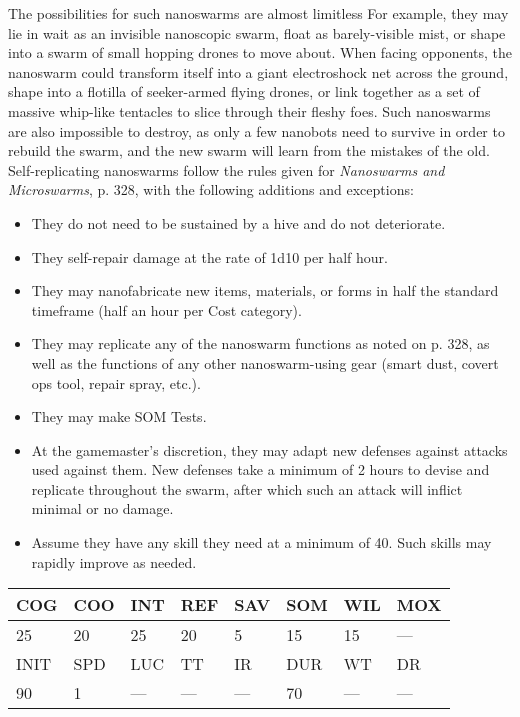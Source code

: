 The possibilities for such nanoswarms are almost limitless
For example, they may lie in wait as an invisible
nanoscopic swarm, float as barely-visible mist, or shape 
into a swarm of small hopping drones to move about. 
When facing opponents, the nanoswarm could transform 
itself into a giant electroshock net across the ground, 
shape into a flotilla of seeker-armed flying drones, or 
link together as a set of massive whip-like tentacles to 
slice through their fleshy foes. Such nanoswarms are 
also impossible to destroy, as only a few nanobots need 
to survive in order to rebuild the swarm, and the new 
swarm will learn from the mistakes of the old.
Self-replicating nanoswarms follow the rules given 
for \textit{Nanoswarms and Microswarms}, p. 328, with the 
following additions and exceptions:

\begin{itemize}
\item  They do not need to be sustained by a hive and 
do not deteriorate.
\item  They self-repair damage at the rate of 1d10 per 
half hour.
\item  They may nanofabricate new items, materials, 
or forms in half the standard timeframe (half an 
hour per Cost category).
\item They may replicate any of the nanoswarm functions
as noted on p. 328, as well as the functions
of any other nanoswarm-using gear (smart dust, 
covert ops tool, repair spray, etc.).
\item  They may make SOM Tests.
\item  At the gamemaster's discretion, they may adapt 
new defenses against attacks used against them. 
New defenses take a minimum of 2 hours to devise 
and replicate throughout the swarm, after which 
such an attack will inflict minimal or no damage.
\item Assume they have any skill they need at a minimum
of 40. Such skills may rapidly improve
as needed.
\end{itemize}

\begin{tabular}{|l|l|l|l|l|l|l|l|}
\hline
COG & COO & INT & REF & SAV & SOM & WIL & MOX \\
\hline
25 & 20 & 25 & 20 & 5 & 15 & 15 & — \\
\hline
INIT & SPD & LUC & TT & IR & DUR & WT & DR \\
\hline
90 & 1 & — & — & — & 70 & — & — \\
\hline
\end{tabular}



